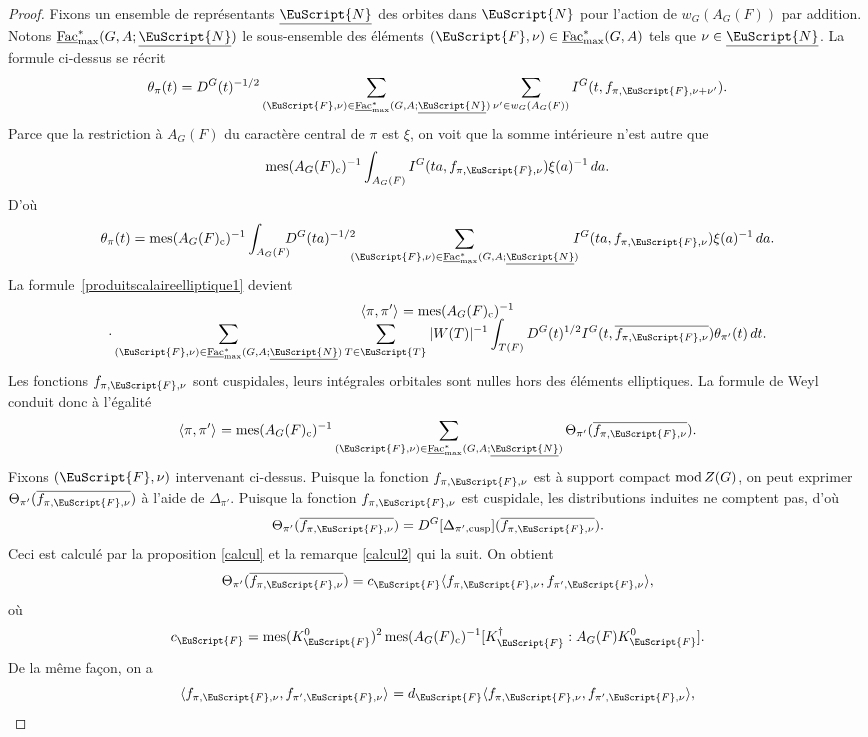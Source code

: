 \documentclass[JEP,XML,SOM,Unicode,francais]{cedram}
\let\mathcal \EuScript
\newcommand{\NoChangel}[1]{%
\expandafter\let\csname old\string#1\endcsname=#1
\let#1=\relax
\newcommand{#1}{\mathcode`l="716C\csname old\string#1\endcsname\mathcode`l="7160 }%
}
\let\<\langle
\let\>\rangle
\newcommand{\rmod}{\textup{mod}\,}
\newcommand{\rc}{\mathrm{c}}
\newcommand{\cusp}{\mathrm{cusp}}
\newcommand{\rell}{\mathrm{ell}} \NoChangel{\rell}
\newcommand{\Fac}{\mathrm{Fac}}
\DeclareMathOperator{\mes}{mes}
\newcommand{\cF}{\mathcal{F}}
\newcommand{\cN}{\mathcal{N}}
\newcommand{\cT}{\mathcal{T}}
\theoremstyle{plain}
\theoremstyle{definition}
\begin{document}
\begin{proof}
Fixons un ensemble de représentants $\underline{\cN}$ des orbites dans $\cN$ pour l'action de $w_{G}(A_{G}(F))$ par addition. Notons $ \underline{\Fac}^*_{\max}(G,A;\underline\cN)$ le sous-ensemble des éléments $(\cF,\nu)\in \underline{\Fac}^*_{\max}(G,A)$ tels que $\nu\in \underline{\cN}$.
La formule ci-dessus se récrit
\[
\theta_{\pi}(t)=D^G(t)^{-1/2}\sum_{(\cF,\nu)\in \underline{\Fac}^*_{\max}(G,A;\underline{\cN})} \sum_{\nu'\in w_{G}(A_{G}(F))}I^G(t,f_{\pi,\cF,\nu+\nu'}).
\]
Parce que la restriction à $A_{G}(F)$ du caractère central de $\pi$ est $\xi$, on voit que la somme intérieure n'est autre que
\[
\mes(A_{G}(F)_{\rc})^{-1}\int_{A_{G}(F)}I^G(ta,f_{\pi,\cF,\nu})\xi(a)^{-1}\,da.
\]
D'où
\[
\theta_{\pi}(t)=\mes(A_{G}(F)_{\rc})^{-1}\int_{A_{G}(F)}\hspace*{-2mm} D^G(ta)^{-1/2}\hspace*{-2mm}\sum_{(\cF,\nu)\in \underline{\Fac}^*_{\max}(G,A;\underline{\cN})}\hspace*{-2mm}I^G(ta,f_{\pi,\cF,\nu})\xi(a)^{-1}\,da.
\]
La formule~\eqref{produitscalaireelliptique1} devient
\begin{multline*}
\<\pi,\pi'\>_{\rell}=\mes(A_{G}(F)_{\rc})^{-1}\\[-5pt]
\cdot\sum_{(\cF,\nu)\in \underline{\Fac}^*_{\max}(G,A;\underline{\cN})} \sum_{T\in \cT_{\rell}}\vert W(T)\vert ^{-1}\int_{T(F)}D^G(t)^{1/2}I^G(t,\overline{f_{\pi,\cF,\nu}})\theta_{\pi'}(t)\,dt.
\end{multline*}
Les fonctions $f_{\pi,\cF,\nu}$ sont cuspidales, leurs intégrales orbitales sont nulles hors des éléments elliptiques. La formule de Weyl conduit donc à l'égalité
\[
\<\pi,\pi'\>_{\rell}=\mes(A_{G}(F)_{\rc})^{-1}\sum_{(\cF,\nu)\in \underline{\Fac}^*_{\max}(G,A;\underline{\cN})} \Theta_{\pi'}(\overline{f_{\pi,\cF,\nu}}).
\]
Fixons $(\cF,\nu)$ intervenant ci-dessus. Puisque la fonction $f_{\pi,\cF,\nu}$ est à support compact $\rmod Z(G)$, on peut exprimer $\Theta_{\pi'}(\overline{f_{\pi,\cF,\nu}})$ à l'aide de $\Delta_{\pi'}$. Puisque la fonction $f_{\pi,\cF,\nu}$ est cuspidale, les distributions induites ne comptent pas, d'où
\[
\Theta_{\pi'}(\overline{f_{\pi,\cF,\nu}})=D^G[\Delta_{\pi',\cusp}](\overline{f_{\pi,\cF,\nu}}).
\]
Ceci est calculé par la proposition \ref{calcul} et la remarque \eqref{calcul2} qui la suit. On obtient
\[
\Theta_{\pi'}(\overline{f_{\pi,\cF,\nu}})=c_{\cF}\<f_{\pi,\cF,\nu},f_{\pi',\cF,\nu}\>,
\]
où
\[
c_{\cF}=\mes(K_{\cF}^0)^2\mes(A_{G}(F)_{\rc})^{-1}[K_{\cF}^{\dag}:A_{G}(F)K_{\cF}^0].
\]
De la même façon, on a
\[
\<f_{\pi,\cF,\nu},f_{\pi',\cF,\nu}\>_{\rell}=d_{\cF}\<f_{\pi,\cF,\nu},f_{\pi',\cF,\nu}\>,
\]
\end{proof}
\end{document}
